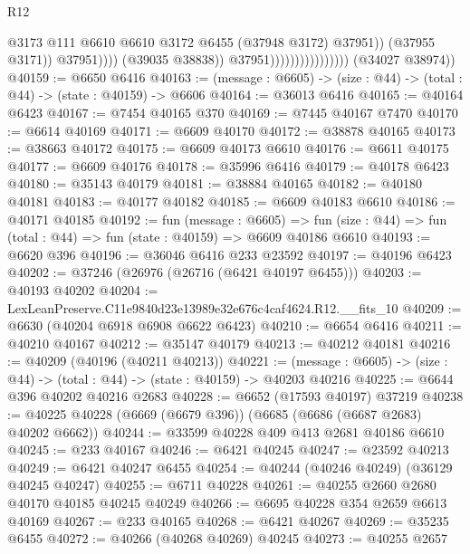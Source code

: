 \begin{lexlean}{R12}
\begin{coremodule}
                                                      @3173
                                                      @111
                                                      @6610
                                                      @6610
                                                      @3172
                                                      @6455
                                                      (@37948 @3172)
                                                      @37951))
                                                  (@37955 @3171))
                                                @37951))))
                                        (@39035 @38838))
                                      @37951))))))))))))))))
      (@34027 @38974))
@40159 := @6650 @6416
@40163 := (message : @6605) -> (size : @44) -> (total : @44) -> (state : @40159) -> @6606
@40164 := @36013 @6416
@40165 := @40164 @6423
@40167 := @7454 @40165 @370
@40169 := @7445 @40167 @7470
@40170 := @6614 @40169
@40171 := @6609 @40170
@40172 := @38878 @40165
@40173 := @38663 @40172
@40175 := @6609 @40173 @6610
@40176 := @6611 @40175
@40177 := @6609 @40176
@40178 := @35996 @6416
@40179 := @40178 @6423
@40180 := @35143 @40179
@40181 := @38884 @40165
@40182 := @40180 @40181
@40183 := @40177 @40182
@40185 := @6609 @40183 @6610
@40186 := @40171 @40185
@40192 := fun (message : @6605) =>
  fun (size : @44) => fun (total : @44) => fun (state : @40159) => @6609 @40186 @6610
@40193 := @6620 @396
@40196 := @36046 @6416 @233 @23592
@40197 := @40196 @6423
@40202 := @37246 (@26976 (@26716 (@6421 @40197 @6455)))
@40203 := @40193 @40202
@40204 := LexLeanPreserve.C11e9840d23e13989e32e676c4caf4624.R12.__fits_10
@40209 := @6630 (@40204 @6918 @6908 @6622 @6423)
@40210 := @6654 @6416
@40211 := @40210 @40167
@40212 := @35147 @40179
@40213 := @40212 @40181
@40216 := @40209 (@40196 (@40211 @40213))
@40221 := (message : @6605) -> (size : @44) -> (total : @44) -> (state : @40159) -> @40203 @40216
@40225 := @6644 @396 @40202 @40216 @2683
@40228 := @6652 (@17593 @40197) @37219
@40238 := @40225 @40228 (@6669 (@6679 @396)) (@6685 (@6686 (@6687 @2683) @40202 @6662))
@40244 := @33599 @40228 @409 @413 @2681 @40186 @6610
@40245 := @233 @40167
@40246 := @6421 @40245
@40247 := @23592 @40213
@40249 := @6421 @40247 @6455
@40254 := @40244 (@40246 @40249) (@36129 @40245 @40247)
@40255 := @6711 @40228
@40261 := @40255 @2660 @2680 @40170 @40185 @40245 @40249
@40266 := @6695 @40228 @354 @2659 @6613 @40169
@40267 := @233 @40165
@40268 := @6421 @40267
@40269 := @35235 @6455
@40272 := @40266 (@40268 @40269) @40245
@40273 := @40255 @2657

\end{coremodule}
\end{lexlean}
